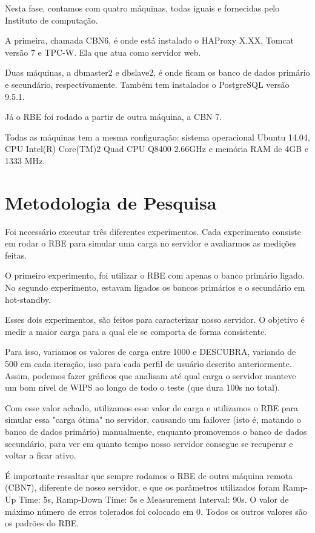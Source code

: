 \documentclass[11pt,twoside]{article}
\begin{document}
     Nesta fase, contamos com quatro máquinas, todas iguais e fornecidas pelo Instituto de computação.

     A primeira, chamada CBN6, é onde está instalado o HAProxy X.XX, Tomcat versão 7 e TPC-W. Ela que atua como servidor web.

     Duas máquinas, a dbmaster2 e dbslave2, é onde ficam os banco de dados primário e secundário, respectivamente. Também tem instalados o PostgreSQL vers\~ao 9.5.1.

     Já o RBE foi rodado a partir de outra máquina, a CBN 7.

     Todas as máquinas tem a mesma configuração: sistema operacional Ubuntu 14.04, CPU Intel(R) Core(TM)2 Quad CPU Q8400 2.66GHz e mem\'oria RAM de 4GB e 1333 MHz.

\section{Metodologia de Pesquisa}
\setlength{\parindent}{4ex}
Foi necessário executar três diferentes experimentos. Cada experimento consiste em rodar o RBE para simular uma carga no servidor e avaliarmos as medições feitas.

O primeiro experimento, foi utilizar o RBE com apenas o banco primário ligado. No segundo experimento, estavam ligados os bancos primários e o secundário em hot-standby.

Esses dois experimentos, são feitos para caracterizar nosso servidor. O objetivo é medir a maior carga para a qual ele se comporta de forma consistente.

Para isso, variamos os valores de carga entre 1000 e DESCUBRA, variando de 500 em cada iteração, isso para cada perfil de usuário descrito anteriormente. Assim, podemos fazer gráficos que analisam até qual carga o servidor manteve um bom nível de WIPS ao longo de todo o teste (que dura 100s no total).

Com esse valor achado, utilizamos esse valor de carga e utilizamos o RBE para simular essa "carga ótima" no servidor, causando um failover (isto é, matando o banco de dados primário) manualmente, enquanto promovemos o banco de dados secundário, para ver em quanto tempo nosso servidor consegue se recuperar e voltar a ficar ativo.

É importante ressaltar que sempre rodamos o RBE de outra máquina remota (CBN7), diferente de nosso servidor, e que os parâmetros utilizados foram Ramp-Up Time: 5s, Ramp-Down Time: 5s e Measurement Interval: 90s. O valor de máximo número de erros tolerados foi colocado em 0. Todos os outros valores são os padrões do RBE.
\end{document}
